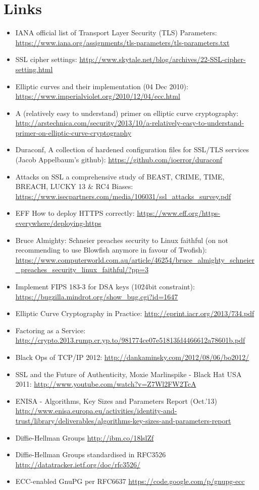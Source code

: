 \section{Links}
\label{section:Links}


\begin{itemize}
\item IANA official list of Transport Layer Security (TLS) Parameters: \url{https://www.iana.org/assignments/tls-parameters/tls-parameters.txt}
\item SSL cipher settings: \url{http://www.skytale.net/blog/archives/22-SSL-cipher-setting.html}
\item Elliptic curves and their implementation (04 Dec 2010): \url{https://www.imperialviolet.org/2010/12/04/ecc.html}
\item A (relatively easy to understand) primer on elliptic curve cryptography: \url{http://arstechnica.com/security/2013/10/a-relatively-easy-to-understand-primer-on-elliptic-curve-cryptography}
\item Duraconf, A collection of hardened configuration files for SSL/TLS services (Jacob Appelbaum's github): \url{https://github.com/ioerror/duraconf}
\item Attacks on SSL a comprehensive study of BEAST, CRIME, TIME, BREACH, LUCKY 13 \& RC4 Biases: \url{https://www.isecpartners.com/media/106031/ssl_attacks_survey.pdf}
\item EFF How to deploy HTTPS correctly: \url{https://www.eff.org/https-everywhere/deploying-https}
\item Bruce Almighty: Schneier preaches security to Linux faithful (on not recommending to use Blowfish anymore in favour of Twofish): \url{https://www.computerworld.com.au/article/46254/bruce_almighty_schneier_preaches_security_linux_faithful/?pp=3}
\item Implement FIPS 183-3 for DSA keys (1024bit constraint): \url{https://bugzilla.mindrot.org/show_bug.cgi?id=1647}
\item Elliptic Curve Cryptography in Practice: \url{http://eprint.iacr.org/2013/734.pdf}
\item Factoring as a Service: \url{http://crypto.2013.rump.cr.yp.to/981774ce07e51813fd4466612a78601b.pdf}
\item Black Ops of TCP/IP 2012: \url{http://dankaminsky.com/2012/08/06/bo2012/}
\item SSL and the Future of Authenticity, Moxie Marlinspike - Black Hat USA 2011: \url{http://www.youtube.com/watch?v=Z7Wl2FW2TcA}
\item ENISA - Algorithms, Key Sizes and Parameters Report (Oct.'13) \url{http://www.enisa.europa.eu/activities/identity-and-trust/library/deliverables/algorithms-key-sizes-and-parameters-report}
\item Diffie-Hellman Groups \url{http://ibm.co/18lslZf}
\item Diffie-Hellman Groups standardised in RFC3526\cite{rfc3526} \url{http://datatracker.ietf.org/doc/rfc3526/}
\item ECC-enabled GnuPG per RFC6637\cite{rfc6637} \url{https://code.google.com/p/gnupg-ecc}
\end{itemize}

